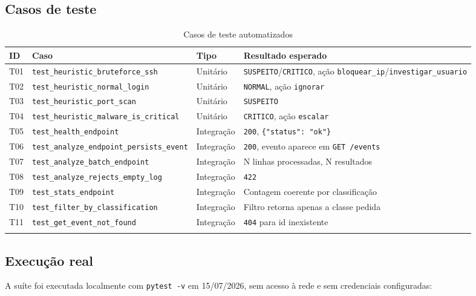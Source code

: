 \documentclass[11pt,a4paper]{article}
\begin{document}
\subsection{Casos de teste}

\begin{longtable}{p{1.2cm}p{5.5cm}p{2.4cm}p{5cm}}
\toprule
\textbf{ID} & \textbf{Caso} & \textbf{Tipo} & \textbf{Resultado esperado} \\
\midrule
\endhead
T01 & \texttt{test\_heuristic\_bruteforce\_ssh} & Unitário & \texttt{SUSPEITO}/\texttt{CRITICO}, ação \texttt{bloquear\_ip}/\texttt{investigar\_usuario} \\
T02 & \texttt{test\_heuristic\_normal\_login} & Unitário & \texttt{NORMAL}, ação \texttt{ignorar} \\
T03 & \texttt{test\_heuristic\_port\_scan} & Unitário & \texttt{SUSPEITO} \\
T04 & \texttt{test\_heuristic\_malware\_is\_critical} & Unitário & \texttt{CRITICO}, ação \texttt{escalar} \\
T05 & \texttt{test\_health\_endpoint} & Integração & \texttt{200}, \texttt{\{"status": "ok"\}} \\
T06 & \texttt{test\_analyze\_endpoint\_persists\_event} & Integração & \texttt{200}, evento aparece em \texttt{GET /events} \\
T07 & \texttt{test\_analyze\_batch\_endpoint} & Integração & N linhas processadas, N resultados \\
T08 & \texttt{test\_analyze\_rejects\_empty\_log} & Integração & \texttt{422} \\
T09 & \texttt{test\_stats\_endpoint} & Integração & Contagem coerente por classificação \\
T10 & \texttt{test\_filter\_by\_classification} & Integração & Filtro retorna apenas a classe pedida \\
T11 & \texttt{test\_get\_event\_not\_found} & Integração & \texttt{404} para id inexistente \\
\bottomrule
\caption{Casos de teste automatizados}
\end{longtable}

\subsection{Execução real}

A suíte foi executada localmente com \texttt{pytest -v} em 15/07/2026, sem acesso à
rede e sem credenciais configuradas:
\end{document}

